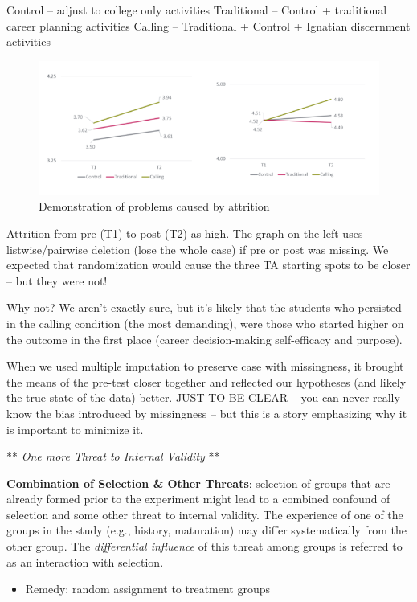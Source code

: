 \documentclass[
  english,
]{book}
\providecommand{\tightlist}{%
  \setlength{\itemsep}{0pt}\setlength{\parskip}{0pt}}
\begin{document}
Control -- adjust to college only activities
Traditional -- Control + traditional career planning activities
Calling -- Traditional + Control + Ignatian discernment activities

\begin{figure}
\centering
\includegraphics{images/Experiment/Campanario.png}
\caption{Demonstration of problems caused by attrition}
\end{figure}

Attrition from pre (T1) to post (T2) as high. The graph on the left uses listwise/pairwise deletion (lose the whole case) if pre or post was missing. We expected that randomization would cause the three TA starting spots to be closer -- but they were not!

Why not? We aren't exactly sure, but it's likely that the students who persisted in the calling condition (the most demanding), were those who started higher on the outcome in the first place (career decision-making self-efficacy and purpose).

When we used multiple imputation to preserve case with missingness, it brought the means of the pre-test closer together and reflected our hypotheses (and likely the true state of the data) better. JUST TO BE CLEAR -- you can never really know the bias introduced by missingness -- but this is a story emphasizing why it is important to minimize it.

** \emph{One more Threat to Internal Validity} **

\textbf{Combination of Selection \& Other Threats}: selection of groups that are already formed prior to the experiment might lead to a combined confound of selection and some other threat to internal validity. The experience of one of the groups in the study (e.g., history, maturation) may differ systematically from the other group. The \emph{differential influence} of this threat among groups is referred to as an interaction with selection.

\begin{itemize}
\tightlist
\item
  Remedy: random assignment to treatment groups
\end{itemize}
\end{document}
